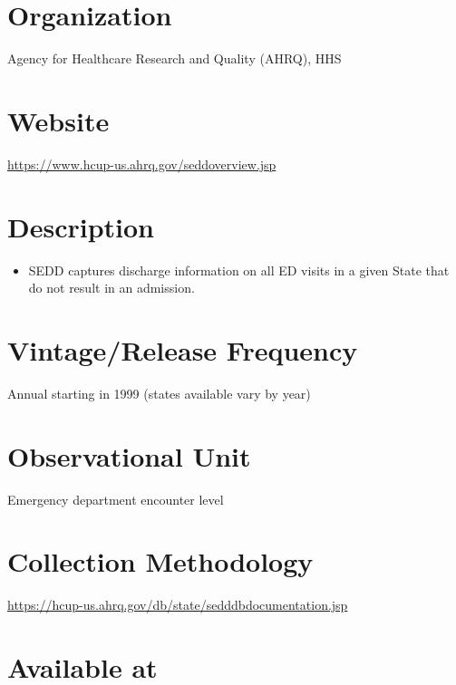 \documentclass[
]{book}
\providecommand{\tightlist}{%
  \setlength{\itemsep}{0pt}\setlength{\parskip}{0pt}}
\begin{document}
\hypertarget{organization-84}{%
\section{Organization}\label{organization-84}}

Agency for Healthcare Research and Quality (AHRQ), HHS

\hypertarget{website-84}{%
\section{Website}\label{website-84}}

\url{https://www.hcup-us.ahrq.gov/seddoverview.jsp}

\hypertarget{description-84}{%
\section{Description}\label{description-84}}

\begin{itemize}
\tightlist
\item
  SEDD captures discharge information on all ED visits in a given State that do not result in an admission.
\end{itemize}

\hypertarget{vintagerelease-frequency-84}{%
\section{Vintage/Release Frequency}\label{vintagerelease-frequency-84}}

Annual starting in 1999 (states available vary by year)

\hypertarget{observational-unit-84}{%
\section{Observational Unit}\label{observational-unit-84}}

Emergency department encounter level

\hypertarget{collection-methodology-84}{%
\section{Collection Methodology}\label{collection-methodology-84}}

\url{https://hcup-us.ahrq.gov/db/state/sedddbdocumentation.jsp}

\hypertarget{available-at-84}{%
\section{Available at}\label{available-at-84}}
\end{document}
